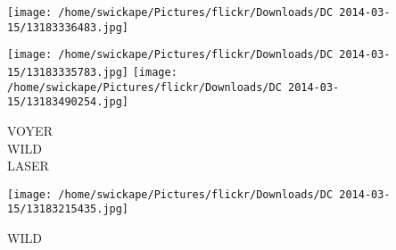 \documentclass[10pt,letterpaper]{article}
\begin{document}
\texttt{[image: /home/swickape/Pictures/flickr/Downloads/DC 2014-03-15/13183336483.jpg]}

\vspace{0.25in}
\texttt{[image: /home/swickape/Pictures/flickr/Downloads/DC 2014-03-15/13183335783.jpg]}
\texttt{[image: /home/swickape/Pictures/flickr/Downloads/DC 2014-03-15/13183490254.jpg]}

VOYER\\
WILD\\
LASER\\
\pagebreak

\texttt{[image: /home/swickape/Pictures/flickr/Downloads/DC 2014-03-15/13183215435.jpg]}

WILD\\
\pagebreak
\end{document}
